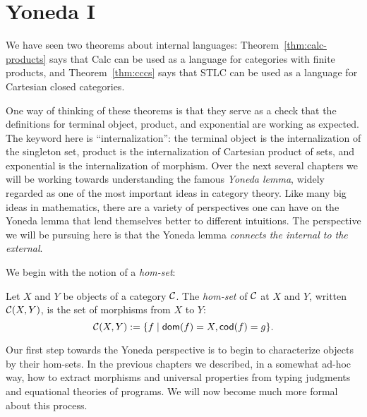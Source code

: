 \chapter{Yoneda I}

We have seen two theorems about internal languages:
Theorem~\ref{thm:calc-products} says that Calc can be used as a language for
categories with finite products, and Theorem~\ref{thm:cccs} says that STLC can
be used as a language for Cartesian closed categories.

One way of thinking of these theorems is that they serve as a check that the
definitions for terminal object, product, and exponential are working as
expected.  The keyword here is ``internalization'': the terminal object is the
internalization of the singleton set, product is the internalization of
Cartesian product of sets, and exponential is the internalization of morphism.
Over the next several chapters we will be working towards understanding the 
famous \emph{Yoneda lemma}, widely regarded as one of the most important 
ideas in category theory. 
Like many big ideas in mathematics, there are a variety of perspectives one can 
have on the Yoneda lemma that lend themselves better to different intuitions.
The perspective we will be pursuing here is that 
the Yoneda lemma \emph{connects the internal to the external}.

We begin with the notion of a \emph{hom-set}:

\vspace{0.2cm}

\begin{definition}
  Let \(X\) and \(Y\) be objects of a category \(\mathcal C\).
  The \emph{hom-set} of $\mathcal C$ at $X$ and $Y$, 
  written \(\mathcal C(X,Y)\),
  is the set of morphisms from \(X\) to \(Y\):
  \[
  \mathcal C(X,Y) := \{f \mid \operatorname{\mathsf{dom}}(f) = X, \operatorname{\mathsf{cod}}(f) = g\}.
  \]
\end{definition}

Our first step towards the Yoneda perspective is to begin to characterize
objects by their hom-sets.  In the previous chapters we described, in a somewhat
ad-hoc way, how to extract morphisms and universal properties from typing
judgments and equational theories of programs. 
We will now become much 
more formal about this process.

